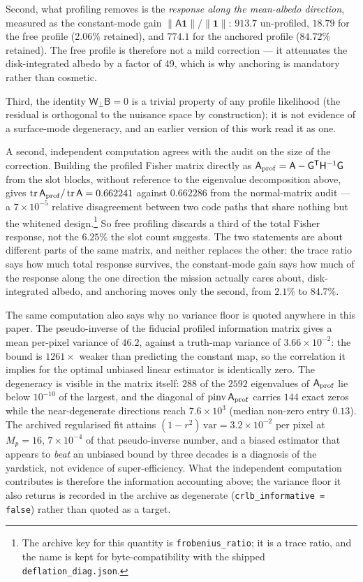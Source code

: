 \documentclass[twocolumn,10pt]{article}
\begin{document}
Second, what profiling removes is the \emph{response along the mean-albedo
direction}, measured as the constant-mode gain $\|\mathsf{A}\mathbf{1}\|/\|\mathbf{1}\|$:
$913.7$ un-profiled, $18.79$ for the free profile ($2.06\%$ retained), and
$774.1$ for the anchored profile ($84.72\%$ retained). The free profile is
therefore not a mild correction --- it attenuates the disk-integrated albedo
by a factor of 49, which is why anchoring is mandatory rather than cosmetic.

Third, the identity $\mathsf{W}_\perp\mathsf{B}=0$ is a trivial
property of any profile likelihood (the residual is orthogonal to the nuisance
space by construction); it is not evidence of a surface-mode degeneracy, and
an earlier version of this work read it as one.

A second, independent computation agrees with the audit on the size of the
correction. Building the profiled Fisher matrix directly as
$\mathsf{A}_{\rm prof}=\mathsf{A}-\mathsf{G}^{\sf T}\mathsf{H}^{-1}\mathsf{G}$
from the slot blocks, without reference to the eigenvalue decomposition above,
gives $\operatorname{tr}\mathsf{A}_{\rm prof}/\operatorname{tr}\mathsf{A} =
0.662241$ against $0.662286$ from the normal-matrix audit --- a
$7\times10^{-5}$ relative disagreement between two code paths that share nothing
but the whitened design.\footnote{The archive key for this quantity is
{\tt frobenius\_ratio}; it is a trace ratio, and the name is kept for
byte-compatibility with the shipped {\tt deflation\_diag.json}.} So free
profiling discards a third of the total Fisher response, not the $6.25\%$ the
slot count suggests. The two statements are about different parts of the same
matrix, and neither replaces the other: the trace ratio says how much total
response survives, the constant-mode gain says how much of the response along
the one direction the mission actually cares about, disk-integrated albedo,
and anchoring moves only the second, from $2.1\%$ to $84.7\%$.

The same computation also says why no variance floor is quoted anywhere in this
paper. The pseudo-inverse of the fiducial profiled information matrix gives a
mean per-pixel variance of $46.2$, against a truth-map variance of
$3.66\times10^{-2}$: the bound is $1261\times$ weaker than predicting the
constant map, so the correlation it implies for the optimal unbiased linear
estimator is identically zero. The degeneracy is visible in the matrix itself:
$288$ of the $2592$ eigenvalues of $\mathsf{A}_{\rm prof}$ lie below $10^{-10}$
of the largest, and the diagonal of $\operatorname{pinv}\mathsf{A}_{\rm prof}$
carries $144$ exact zeros while the near-degenerate directions reach
$7.6\times10^{3}$ (median non-zero entry $0.13$).
The archived regularised fit attains $(1-r^2)\,\mathrm{var}=3.2\times10^{-2}$
per pixel at $M_p=16$, $7\times10^{-4}$ of that pseudo-inverse number, and a
biased estimator that appears to \emph{beat} an unbiased bound by three decades
is a diagnosis of the yardstick, not evidence of super-efficiency. What the
independent computation contributes is therefore the information accounting
above; the variance floor it also returns is recorded in the archive as
degenerate ({\tt crlb\_informative = false}) rather than quoted as a target.
\end{document}

